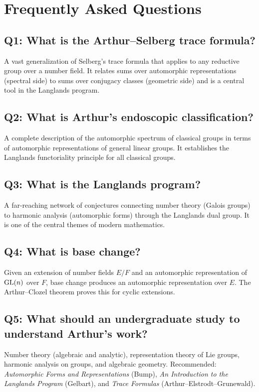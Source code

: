 \section{Frequently Asked Questions}

\subsection*{Q1: What is the Arthur--Selberg trace formula?}
A vast generalization of Selberg's trace formula that applies to any reductive group over a number field. It relates sums over automorphic representations (spectral side) to sums over conjugacy classes (geometric side) and is a central tool in the Langlands program.

\subsection*{Q2: What is Arthur's endoscopic classification?}
A complete description of the automorphic spectrum of classical groups in terms of automorphic representations of general linear groups. It establishes the Langlands functoriality principle for all classical groups.

\subsection*{Q3: What is the Langlands program?}
A far-reaching network of conjectures connecting number theory (Galois groups) to harmonic analysis (automorphic forms) through the Langlands dual group. It is one of the central themes of modern mathematics.

\subsection*{Q4: What is base change?}
Given an extension of number fields $E/F$ and an automorphic representation of $\operatorname{GL}(n)$ over $F$, base change produces an automorphic representation over $E$. The Arthur--Clozel theorem proves this for cyclic extensions.

\subsection*{Q5: What should an undergraduate study to understand Arthur's work?}
Number theory (algebraic and analytic), representation theory of Lie groups, harmonic analysis on groups, and algebraic geometry. Recommended: \textit{Automorphic Forms and Representations} (Bump), \textit{An Introduction to the Langlands Program} (Gelbart), and \textit{Trace Formulas} (Arthur--Elstrodt--Grunewald).

